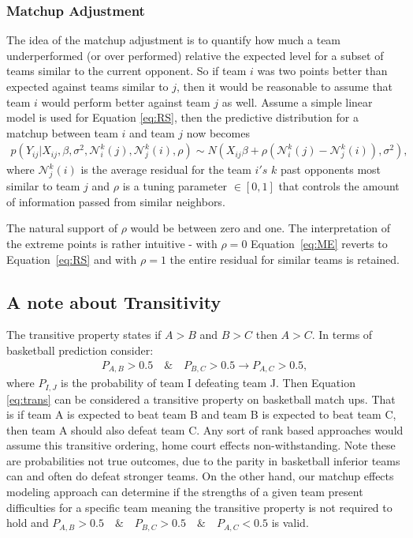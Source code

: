 \subsubsection{Matchup Adjustment}
The idea of the matchup adjustment is to quantify how much a team underperformed (or over performed) relative the expected level for a subset of teams similar to the current opponent.  So if team $i$ was two points better than expected against teams similar to $j$, then it would be reasonable to assume that team $i$ would perform better against team $j$ as well.  Assume a simple linear model is used for Equation \ref{eq:RS}, then the predictive distribution for a matchup between team $i$ and team $j$ now becomes 
\begin{eqnarray}
p(Y_{ij}|X_{ij}, \beta,\sigma^2,\mathcal{N}_i^k(j),\mathcal{N}_j^k(i), \rho) \sim N(X_{ij} \beta + \rho(\mathcal{N}_i^k(j) -\mathcal{N}_j^k(i)), \sigma^2),
\label{eq:ME}
\end{eqnarray}
where $\mathcal{N}_j^k(i)$ is the average residual for the team $i's$ $k$ past opponents most similar to team $j$ and $\rho$ is a tuning parameter $\in [0,1]$ that controls the amount of information passed from similar neighbors. 

The natural support of $\rho$ would be between zero and one.  The interpretation of the extreme points is rather intuitive - with $\rho = 0$ Equation~\ref{eq:ME} reverts to Equation~\ref{eq:RS} and with $\rho = 1$ the entire residual for similar teams is retained. 
\subsection{A note about Transitivity}
The transitive property states if $A>B$ and $B>C$ then $A>C$.   In terms of basketball prediction consider:
\begin{eqnarray}
P_{A,B} > 0.5 \quad \& \quad P_{B,C} > 0.5 \rightarrow P_{A,C} > 0.5,
\label{eq:trans}
\end{eqnarray}
where $P_{I,J}$ is the probability of team I defeating team J.  Then Equation \ref{eq:trans} can be considered a transitive property on basketball match ups.  That is if team A is expected to beat team B and team B is expected to beat team C, then team A should also defeat team C.  Any sort of rank based approaches would assume this transitive ordering, home court effects non-withstanding.  Note these are probabilities not true outcomes, due to the parity in basketball inferior teams can and often do defeat stronger teams.  On the other hand, our matchup effects modeling approach can determine if the strengths of a given team present difficulties for a specific team meaning the transitive property is not required to hold and $P_{A,B} > 0.5 \quad \& \quad P_{B,C} > 0.5\quad \& \quad P_{A,C} < 0.5$ is valid.
